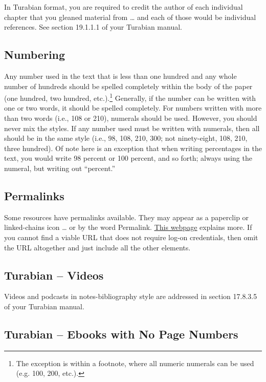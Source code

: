 \documentclass[raggedright]{turabian-researchpaper}
\newcommand*{\bluehref}[2]{\href{#1}{\color{blue}\underline{#2}}}
\begin{document}
In Turabian format, you are required to credit the author of each individual
chapter that you gleaned material from \dots{} and each of those would be
individual references. See section 19.1.1.1 of your Turabian
manual.\autocite[232]{Turabian}

\subsection{Numbering}

Any number used in the text that is less than one hundred and any whole number
of hundreds should be spelled completely within the body of the paper (one
hundred, two hundred, etc.).\footnote{The exception is within a footnote, where
all numeric numerals can be used (e.g. 100, 200, etc.).} Generally, if the
number can be written with one or two words, it should be spelled completely.
For numbers written with more than two words (i.e., 108 or 210), numerals should
be used. However, you should never mix the styles. If any number used must be
written with numerals, then all should be in the same style (i.e., 98, 108, 210,
300; not ninety-eight, 108, 210, three hundred). Of note here is an exception
that when writing percentages in the text, you would write 98 percent or 100
percent, and so forth; always using the numeral, but writing out ``percent.''

\subsection{Permalinks}

Some resources have permalinks available. They may appear as a paperclip or
linked-chains icon \dots{} or by the word Permalink.
\bluehref{http://umuc.edu/library/libhow/linking.cfm}{This webpage} explains
more. If you cannot find a viable URL that does not require log-on credentials,
then omit the URL altogether and just include all the other elements.

\subsection{Turabian -- Videos}

Videos and podcasts in notes-bibliography style are addressed in section
17.8.3.5 of your Turabian manual.\autocite[204]{Turabian}

\subsection{Turabian -- Ebooks with No Page Numbers}
\end{document}

